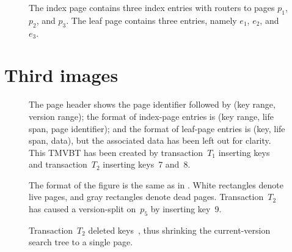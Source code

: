 \begin{figure}[!htb]
\begin{center}
%
{The index page contains three index entries with routers to pages $p_1$,
$p_2$, and $p_3$. 
The leaf page contains three entries, namely $e_1$, $e_2$, and $e_3$.}
\label{fig:tmvbt-active-entries}
\end{center}
\end{figure}

\chapter{Third images}

\begin{figure}[!hbt]
\begin{center}
  
  {
  The page header shows the page identifier followed by (key range, version
  range); 
  the format of index-page entries is (key range, life span, page
  identifier); and 
  the format of leaf-page entries is (key, life span, data), but
  the associated data has been left out for clarity. 
  This TMVBT has been created by transaction~$T_1$
  inserting keys~ and transaction~$T_2$ inserting
  keys~\num{7} and~\num{8}.
  }
  \label{fig:example-oper-1}
\end{center}
\end{figure}

\begin{figure}[!htb]
\begin{center}
  
  {
  The format of the figure is the same as in .
  White rectangles denote live pages, and gray rectangles denote dead pages.
  Transaction~$T_2$ has caused a version-split on~$p_5$ by inserting
  key~\num{9}.}
  \label{fig:example-oper-2}
\end{center}
\end{figure}

\begin{figure}[!htb]
\begin{center}
  
  {Transaction~$T_2$ deleted keys~, thus shrinking
  the current-version search tree to a single page.}
  \label{fig:example-oper-3}
\end{center}
\end{figure}


